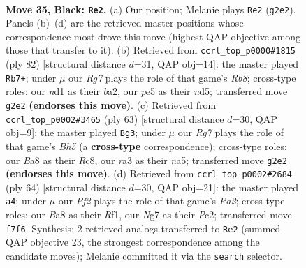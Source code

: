 \documentclass[11pt]{article}
\begin{document}
\clearpage

\begin{figure}[p]\centering
\begin{subfigure}{0.46\textwidth}\centering
\resizebox{\linewidth}{!}{%
\newchessgame
\chessboard[
  setfen={b4k2/P4pn1/6p1/4P3/5K2/R4N1P/6r1/3N4 b - - 6 35},
  showmover=false,
  pgfstyle=straightmove, color=movearrow, markmove={g2-e2}
]}
\caption{}
\end{subfigure}\hfill
\begin{subfigure}{0.46\textwidth}\centering
\resizebox{\linewidth}{!}{%
\newchessgame
\chessboard[
  setfen={1R6/6kp/3N2p1/3nP3/8/3B1KP1/b6r/8 w - - 7 42},
  showmover=false,
  pgfstyle=straightmove, color=movearrow, markmove={b8-b7}
]}
\caption{}
\end{subfigure}
\\[4pt]
\begin{subfigure}{0.46\textwidth}\centering
\resizebox{\linewidth}{!}{%
\newchessgame
\chessboard[
  setfen={2r3k1/p4pp1/7p/N3R3/2P4b/7P/P5P1/5K2 b - - 3 32},
  showmover=false,
  pgfstyle=straightmove, color=movearrow, markmove={h4-g3}
]}
\caption{}
\end{subfigure}\hfill
\begin{subfigure}{0.46\textwidth}\centering
\resizebox{\linewidth}{!}{%
\newchessgame
\chessboard[
  setfen={8/R7/1r3npk/1p6/2n5/8/P1P3P1/5RK1 w - - 1 33},
  showmover=false,
  pgfstyle=straightmove, color=movearrow, markmove={a2-a4}
]}
\caption{}
\end{subfigure}
\caption{\textbf{Move 35, Black: \texttt{Re2}.} (a) Our position; Melanie plays \texttt{Re2} (\texttt{g2e2}). Panels (b)--(d) are the retrieved master positions whose correspondence most drove this move (highest QAP objective among those that transfer to it). (b) Retrieved from \texttt{ccrl\_top\_p0000\#1815} (ply 82) [structural distance $d$=31, QAP obj=14]: the master played \texttt{Rb7+}; under $\mu$ our \emph{Rg7} plays the role of that game's \emph{Rb8}; cross-type roles: our \emph{n}d1 as their \emph{b}a2, our \emph{p}e5 as their \emph{n}d5; transferred move \texttt{g2e2} \textbf{(endorses this move)}. (c) Retrieved from \texttt{ccrl\_top\_p0002\#3465} (ply 63) [structural distance $d$=30, QAP obj=9]: the master played \texttt{Bg3}; under $\mu$ our \emph{Rg7} plays the role of that game's \emph{Bh5} (a \textbf{cross-type} correspondence); cross-type roles: our \emph{B}a8 as their \emph{R}c8, our \emph{r}a3 as their \emph{n}a5; transferred move \texttt{g2e2} \textbf{(endorses this move)}. (d) Retrieved from \texttt{ccrl\_top\_p0002\#2684} (ply 64) [structural distance $d$=30, QAP obj=21]: the master played \texttt{a4}; under $\mu$ our \emph{Pf2} plays the role of that game's \emph{Pa2}; cross-type roles: our \emph{B}a8 as their \emph{R}f1, our \emph{N}g7 as their \emph{P}c2; transferred move \texttt{f7f6}. Synthesis: 2 retrieved analogs transferred to \texttt{Re2} (summed QAP objective 23, the strongest correspondence among the candidate moves); Melanie committed it via the \texttt{search} selector.}
\label{fig:thought-m69}
\end{figure}
\end{document}
